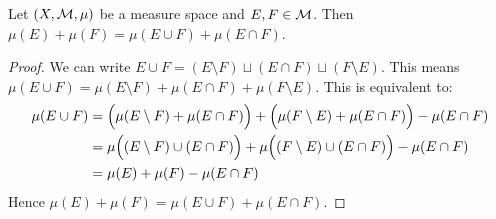     \begin{proposition}
        Let $(X,\mathcal{M},\mu)$ be a measure space and $E,F \in \mathcal{M}$. Then $\mu(E) + \mu(F) = \mu(E \cup F) + \mu(E \cap F)$.
    \end{proposition}
        \begin{proof}
            We can write $E \cup F = (E\setminus F) \sqcup (E \cap F) \sqcup (F \setminus E)$. This means $\mu(E \cup F) = \mu(E\setminus F) + \mu(E \cap F) + \mu(F\setminus E)$.  This is equivalent to:
                \begin{equation*}
                \begin{split}
                    \mu(E \cup F)
                    & = \Bigl(\mu(E \setminus F) + \mu(E \cap F)\Bigr) + \Bigl(\mu(F \setminus E) + \mu(E \cap F)\Bigr) - \mu(E \cap F) \\
                    & = \mu\Bigl((E \setminus F) \cup (E \cap F)\Bigr) + \mu \Bigl((F \setminus E) \cup (E \cap F)\Bigr) - \mu(E \cap F) \\
                    & = \mu(E) + \mu(F) - \mu(E \cap F)
                \end{split}
                \end{equation*}
            Hence $\mu(E) + \mu(F) = \mu(E \cup F) + \mu(E \cap F)$.
        \end{proof}

